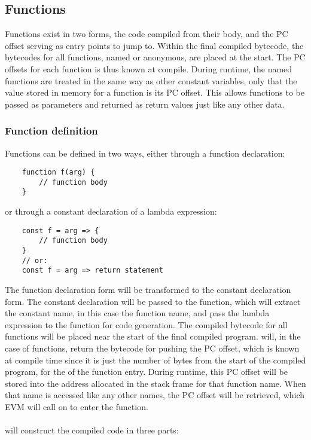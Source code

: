 \subsection{Functions}
Functions exist in two forms, the code compiled from their body, and the PC offset serving as entry points to jump to. Within the final compiled bytecode, the bytecodes for all functions, named or anonymous, are placed at the start. The PC offsets for each function is thus known at compile. During runtime, the named functions are treated in the same way as other constant variables, only that the value stored in memory for a function is its PC offset. This allows functions to be passed as parameters and returned as return values just like any other data. 
\subsubsection{Function definition}
Functions can be defined in two ways, either through a function declaration: 
\begin{verbatim}
    function f(arg) {
        // function body
    }
\end{verbatim}
or through a constant declaration of a lambda expression: 
\begin{verbatim}
    const f = arg => {
        // function body
    }
    // or: 
    const f = arg => return statement
\end{verbatim}
The function declaration form will be transformed to the constant declaration form. The constant declaration will be passed to the  function, which will extract the constant name, in this case the function name, and pass the lambda expression to the  function for code generation. The compiled bytecode for all functions will be placed near the start of the final compiled program.  will, in the case of functions, return the bytecode for pushing the PC offset, which is known at compile time since it is just the number of bytes from the start of the compiled program, for the  of the function entry. During runtime, this PC offset will be stored into the address allocated in the stack frame for that function name. When that name is accessed like any other names, the PC offset will be retrieved, which EVM will call  on to enter the function. \\\\
 will construct the compiled code in three parts: 
